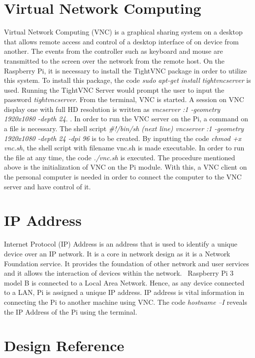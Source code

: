 \section{Virtual Network Computing}
Virtual Network Computing (VNC) is a graphical sharing system on a desktop that allows remote access and control of a desktop interface of on device from another. The events from the controller such as keyboard and mouse are transmitted to the screen over the network from the remote host. 
	On the Raspberry Pi, it is necessary to install the TightVNC package in order to utilize this system. To install this package, the code  \textsl{sudo apt-get install tightvncserver} is used. Running the TightVNC Server would prompt the user to input the password \textsl{tightvncserver}. From the terminal, VNC is started. A session on VNC display one with full HD resolution is written as \textsl{vncserver :1 -geometry 1920x1080 -depth 24}.
.	In order to run the VNC server on the Pi, a command on a file is necessary. The shell script \textsl{#!/bin/sh (next line) vncserver :1 -geometry 1920x1080 -depth 24 -dpi 96} is to be created. By inputting the code \textsl{chmod +x vnc.sh}, the shell script with filename vnc.sh is made executable. In order to run the file at any time, the code \textsl{./vnc.sh} is executed.
	The procedure mentioned above is the initialization of VNC on the Pi module. With this, a VNC client on the personal computer is needed in order to connect the computer to the VNC server and have control of it.~\cite{vnc}
	
\section{IP Address}
	Internet Protocol (IP) Address is an address that is used to identify a unique device over an IP network. It is a core in network design as it is a Network Foundation service. It provides the foundation of other network and user services and it allows the interaction of devices within the network.~\cite{cisco}
	Raspberry Pi 3 model B is connected to a Local Area Network. Hence, as any device connected to a LAN, Pi is assigned a unique IP address. IP address is vital information in connecting the Pi to another machine using VNC. The code \textsl{hostname –I} reveals the IP Address of the Pi using the terminal.
		





\section{Design Reference}

